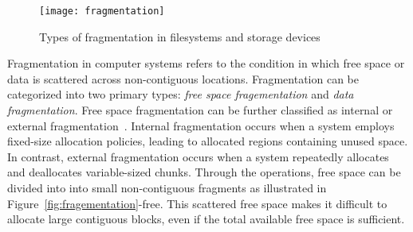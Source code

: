 \begin{comment}
Secondly, SSDs enhance read performance through prefetching, which loads subsequent data in advance based on LBA.
Fragmentation can cause this prefetching to load unnecessary data.\cite{Defragmentation_Log_write_is_ssd_to_bad} For these reasons, filesystem fragmentation is also a concern in SSDs.

\noindent {\textbf{Logical fragmentation and physical fragmentation.}}
I/O performance in flash storage is affected in different ways by logical fragmentation and physical fragmentation.\cite{janusd:atc17}
Logical fragmentation occurs when files are allocated in multiple fragmented storage spaces (extents) within the filesystem.
When a file is not stored contiguously and is spread across various locations, the filesystem recognizes this as being in a logically fragmented state.
As a result, more I/O requests are needed to read the file, which increases overhead in I/O scheduling and handshaking processes.

On the other hand, physical fragmentation happens when the data of a file is allocated non-contiguously at the physical locations of the storage device.
In flash storage, data can be distributed across multiple channels, which directly impacts I/O parallelism.
This can lead to a degradation in I/O performance.
Even if the Physical Block Address (PBA) is contiguous, if the Logical Block Address (LBA) is non-contiguous, separate I/O requests become necessary.
This increases the number of I/O requests, which can lower the overall performance of the system.
Therefore, logical fragmentation and physical fragmentation can occur independently, and appropriate measures are needed to address each issue.
\end{comment}

\begin{figure*}
    \centering
    \texttt{[image: fragmentation]}
	\caption{Types of fragmentation in filesystems and storage devices
	}
    \label{fig:fragmentation}
\end{figure*}

Fragmentation in computer systems refers to the condition in which free space or data is scattered across non-contiguous locations.
Fragmentation can be categorized into two primary types: \emph{free space fragementation} and \emph{data fragmentation}.
Free space fragmentation can be further classified as internal or external fragmentation~\cite{osteps,os-textbook}.
Internal fragmentation occurs when a system employs fixed-size allocation policies, leading to allocated regions containing unused space.
In contrast, external fragmentation occurs when a system repeatedly allocates and deallocates variable-sized chunks.
Through the operations, free space can be divided into into small non-contiguous fragments as illustrated in Figure~\ref{fig:fragementation}-free.
This scattered free space makes it difficult to allocate large contiguous blocks, even if the total available free space is sufficient.


